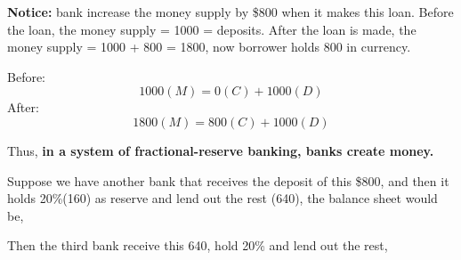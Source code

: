 \documentclass[12pt]{article}
\begin{document}
{\textbf {Notice:}} bank increase the money supply by \$800 when it makes this loan.
Before the loan, the money supply = 1000 = deposits. After the loan is made, 
the money supply = 1000 + 800 = 1800, now borrower holds 800 in currency.

Before:
\begin{equation*}
		1000(M) = 0(C) + 1000(D)
\end{equation*}
After:
\begin{equation*}
		1800(M) = 800(C) + 1000(D)
\end{equation*}

Thus, {\textbf {in a system of fractional-reserve banking, banks create money.}}





Suppose we have another bank that receives the deposit of this \$800, and then it
holds 20\%(160) as reserve and lend out the rest (640), the balance sheet would be,

\begin{figure}[H]
\end{figure}

Then the third bank receive this 640, hold 20\% and lend out the rest,

\begin{figure}[H]
\end{figure}
\end{document}
